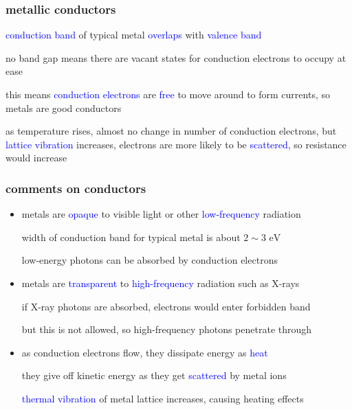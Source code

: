 \documentclass[12pt,xcolor=svgnames,handout]{beamer}
\newcommand{\tightframetitle}[1]{ %
\frametitle{#1}\vspace{-.6\baselineskip}}
\begin{document}
\begin{frame}
	\tightframetitle{metallic conductors}
	
	\begin{block}{}
		\textcolor{blue}{conduction band} of typical metal \textcolor{blue}{overlaps} with \textcolor{blue}{valence band}
		
		no band gap means there are vacant states for conduction electrons to occupy at ease
		
		this means \textcolor{blue}{conduction electrons} are \textcolor{blue}{free} to move around to form currents, so metals are good conductors
	\end{block}
	
	\begin{block}{}
		as temperature rises, almost no change in number of conduction electrons, but \textcolor{blue}{lattice vibration} increases, electrons are more likely to be \textcolor{blue}{scattered}, so resistance would increase
	\end{block}
	
\end{frame}

\begin{frame}
	\tightframetitle{comments on conductors}
	
	\begin{block}{}
		\footnotesize
		\begin{itemize}
			\item metals are \textcolor{blue}{opaque} to visible light or other \textcolor{blue}{low-frequency} radiation
			
			width of conduction band for typical metal is about $2\sim3 \text{ eV}$
			
			low-energy photons can be absorbed by conduction electrons
			
			\item metals are \textcolor{blue}{transparent} to \textcolor{blue}{high-frequency} radiation such as X-rays
			
			if X-ray photons are absorbed, electrons would enter forbidden band
			
			but this is not allowed, so high-frequency photons penetrate through
			
			\item as conduction electrons flow, they dissipate energy as \textcolor{blue}{heat}
			
			they give off kinetic energy as they get \textcolor{blue}{scattered} by metal ions
			
			\textcolor{blue}{thermal vibration} of metal lattice increases, causing heating effects
		\end{itemize}
	\end{block}
	
\end{frame}
\end{document}
